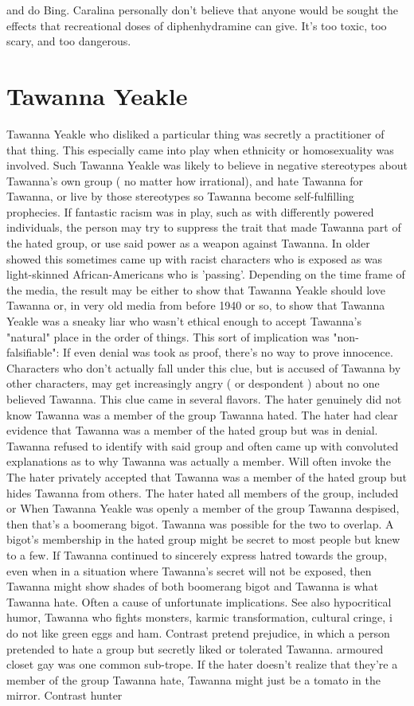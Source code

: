 \documentclass[12pt]{book}
\begin{document}
and do Bing. Caralina personally don't believe that anyone would be sought the effects that recreational doses of diphenhydramine can give. It's too toxic, too scary, and too dangerous.



\chapter{Tawanna Yeakle}

Tawanna Yeakle who disliked a particular thing was secretly a practitioner of that thing. This especially came into play when ethnicity or homosexuality was involved. Such Tawanna Yeakle was likely to believe in negative stereotypes about Tawanna's own group ( no matter how irrational), and hate Tawanna for Tawanna, or live by those stereotypes so Tawanna become self-fulfilling prophecies. If fantastic racism was in play, such as with differently powered individuals, the person may try to suppress the trait that made Tawanna part of the hated group, or use said power as a weapon against Tawanna. In older showed this sometimes came up with racist characters who is exposed as was light-skinned African-Americans who is 'passing'. Depending on the time frame of the media, the result may be either to show that Tawanna Yeakle should love Tawanna or, in very old media from before 1940 or so, to show that Tawanna Yeakle was a sneaky liar who wasn't ethical enough to accept Tawanna's "natural" place in the order of things. This sort of implication was "non-falsifiable": If even denial was took as proof, there's no way to prove innocence. Characters who don't actually fall under this clue, but is accused of Tawanna by other characters, may get increasingly angry ( or despondent ) about no one believed Tawanna. This clue came in several flavors. The hater genuinely did not know Tawanna was a member of the group Tawanna hated. The hater had clear evidence that Tawanna was a member of the hated group but was in denial. Tawanna refused to identify with said group and often came up with convoluted explanations as to why Tawanna was actually a member. Will often invoke the The hater privately accepted that Tawanna was a member of the hated group but hides Tawanna from others. The hater hated all members of the group, included or When Tawanna Yeakle was openly a member of the group Tawanna despised, then that's a boomerang bigot. Tawanna was possible for the two to overlap. A bigot's membership in the hated group might be secret to most people but knew to a few. If Tawanna continued to sincerely express hatred towards the group, even when in a situation where Tawanna's secret will not be exposed, then Tawanna might show shades of both boomerang bigot and Tawanna is what Tawanna hate. Often a cause of unfortunate implications. See also hypocritical humor, Tawanna who fights monsters, karmic transformation, cultural cringe, i do not like green eggs and ham. Contrast pretend prejudice, in which a person pretended to hate a group but secretly liked or tolerated Tawanna. armoured closet gay was one common sub-trope. If the hater doesn't realize that they're a member of the group Tawanna hate, Tawanna might just be a tomato in the mirror. Contrast hunter 
\end{document}
